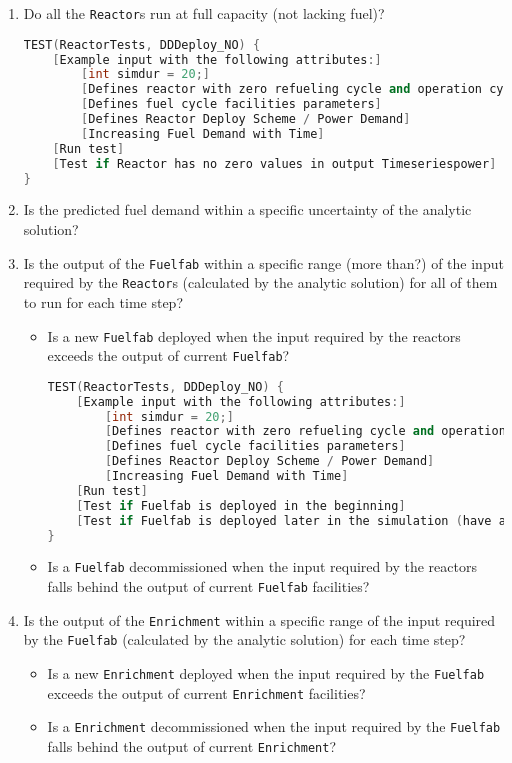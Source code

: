 \documentclass[12pt,letterpaper]{article}
\begin{document}
\begin{enumerate}
\item  Do all the \texttt{Reactor}s run at full capacity (not lacking fuel)? 
\begin{lstlisting}[language=C++, caption=Test to see all reactors run without lack of fuel]
TEST(ReactorTests, DDDeploy_NO) {
    [Example input with the following attributes:]
        [int simdur = 20;]
        [Defines reactor with zero refueling cycle and operation cycle of 1 month]
        [Defines fuel cycle facilities parameters]
        [Defines Reactor Deploy Scheme / Power Demand]
        [Increasing Fuel Demand with Time]
    [Run test]
    [Test if Reactor has no zero values in output Timeseriespower]
}
\end{lstlisting}

\item Is the predicted fuel demand within a specific uncertainty of the analytic solution? 

\item  Is the output of the \texttt{Fuelfab} within a specific range (more than?) of the input required by the \texttt{Reactor}s (calculated by the analytic solution) for all of them to run for each time step? 
\begin{itemize}
\item Is a new \texttt{Fuelfab} deployed when the input required by the reactors exceeds the output of current \texttt{Fuelfab}?
\begin{lstlisting}[language=C++, caption=Test demand-driven deployment of fuel cycle facility]
TEST(ReactorTests, DDDeploy_NO) {
    [Example input with the following attributes:]
        [int simdur = 20;]
        [Defines reactor with zero refueling cycle and operation cycle of 1 month]
        [Defines fuel cycle facilities parameters]
        [Defines Reactor Deploy Scheme / Power Demand]
        [Increasing Fuel Demand with Time]
    [Run test]
    [Test if Fuelfab is deployed in the beginning]
    [Test if Fuelfab is deployed later in the simulation (have analytic solution)]
}
\end{lstlisting}
\item Is a \texttt{Fuelfab} decommissioned when the input required by the reactors falls behind the output of current \texttt{Fuelfab} facilities?
\end{itemize}

\item  Is the output of the \texttt{Enrichment} within a specific range of the input required by the \texttt{Fuelfab} (calculated by the analytic solution) for each time step? 
\begin{itemize}
\item Is a new \texttt{Enrichment} deployed when the input required by the \texttt{Fuelfab} exceeds the output of current \texttt{Enrichment} facilities?
\item Is a \texttt{Enrichment} decommissioned when the input required by the \texttt{Fuelfab} falls behind the output of current \texttt{Enrichment}?
\end{itemize}


\end{enumerate}
\end{document}
